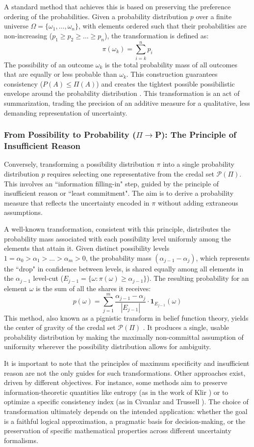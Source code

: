 A standard method that achieves this is based on preserving the preference ordering of the probabilities. Given a probability distribution $p$ over a finite universe $\Omega = \{\omega_1, \dots, \omega_n\}$, with elements ordered such that their probabilities are non-increasing ($p_1 \ge p_2 \ge \dots \ge p_n$), the transformation is defined as:
\[ \pi(\omega_k) = \sum_{i=k}^{n} p_i \]
The possibility of an outcome $\omega_k$ is the total probability mass of all outcomes that are equally or less probable than $\omega_k$. This construction guarantees consistency ($P(A) \le \Pi(A)$) and creates the tightest possible possibilistic envelope around the probability distribution \cite{Dubois1997}. This transformation is an act of summarization, trading the precision of an additive measure for a qualitative, less demanding representation of uncertainty.

\subsubsection{From Possibility to Probability ($\Pi\to$P): The Principle of Insufficient Reason}
Conversely, transforming a possibility distribution $\pi$ into a single probability distribution $p$ requires selecting one representative from the credal set $\mathcal{P}(\Pi)$. This involves an ``information filling-in" step, guided by the principle of insufficient reason or ``least commitment". The aim is to derive a probability measure that reflects the uncertainty encoded in $\pi$ without adding extraneous assumptions.

A well-known transformation, consistent with this principle, distributes the probability mass associated with each possibility level uniformly among the elements that attain it. Given distinct possibility levels $1 = \alpha_0 > \alpha_1 > \dots > \alpha_m > 0$, the probability mass $(\alpha_{j-1} - \alpha_j)$, which represents the ``drop" in confidence between levels, is shared equally among all elements in the $\alpha_{j-1}$ level-cut ($E_{j-1} = \{\omega : \pi(\omega) \ge \alpha_{j-1}\}$). The resulting probability for an element $\omega$ is the sum of all the shares it receives:
\[ p(\omega) = \sum_{j=1}^{m} \frac{\alpha_{j-1} - \alpha_j}{|E_{j-1}|} \cdot \mathbf{1}_{E_{j-1}}(\omega) \]
This method, also known as a pignistic transform in belief function theory, yields the center of gravity of the credal set $\mathcal{P}(\Pi)$ \cite{Dubois1997}. It produces a single, usable probability distribution by making the maximally non-committal assumption of uniformity wherever the possibility distribution allows for ambiguity.

It is important to note that the principles of maximum specificity and insufficient reason are not the only guides for such transformations. Other approaches exist, driven by different objectives. For instance, some methods aim to preserve information-theoretic quantities like entropy (as in the work of Klir \cite{Klir1990}) or to optimize a specific consistency index (as in Civanlar and Trussell \cite{Civanlar1986}). The choice of transformation ultimately depends on the intended application: whether the goal is a faithful logical approximation, a pragmatic basis for decision-making, or the preservation of specific mathematical properties across different uncertainty formalisms.